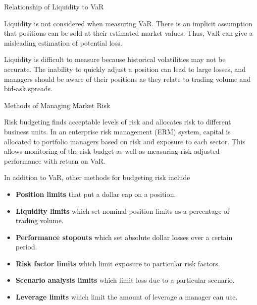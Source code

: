 \documentclass[../custom]{flashcards}
\newcommand{\studyArea}{Risk Management}
\begin{document}
\begin{flashcard}[\studyArea]{Relationship of Liquidity to VaR}
    \begin{flushleft}
        Liquidity is not considered when measuring VaR. There is an implicit assumption that positions can be sold at their estimated market values. Thus, VaR can give a misleading estimation of potential loss.\newline

        Liquidity is difficult to measure because historical volatilities may not be accurate. The inability to quickly adjust a position can lead to large losses, and managers should be aware of their positions as they relate to trading volume and bid-ask spreads.
    \end{flushleft}
\end{flashcard}

\begin{flashcard}[\studyArea]{Methods of Managing Market Risk}
    \begin{flushleft}
        Risk budgeting finds acceptable levels of risk and allocates risk to different business units. In an enterprise risk management (ERM) system, capital is allocated to portfolio managers based on risk and exposure to each sector. This allows monitoring of the risk budget as well as measuring risk-adjusted performance with return on VaR.\newline

        In addition to VaR, other methods for budgeting risk include
        \begin{itemize}
            \item \textbf{Position limits} that put a dollar cap on a position.
            \item \textbf{Liquidity limits} which set nominal position limits as a percentage of trading volume.
            \item \textbf{Performance stopouts} which set absolute dollar losses over a certain period.
            \item \textbf{Risk factor limits} which limit exposure to particular risk factors.
            \item \textbf{Scenario analysis limits} which limit loss due to a particular scenario.
            \item \textbf{Leverage limits} which limit the amount of leverage a manager can use.
        \end{itemize}
    \end{flushleft}
\end{flashcard}
\end{document}
